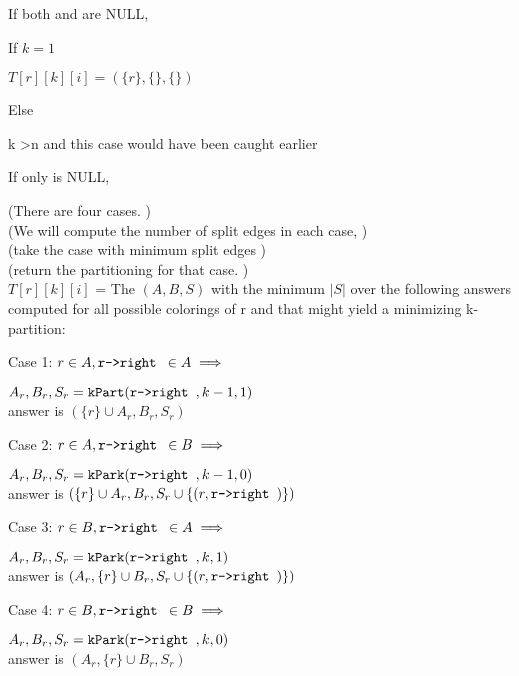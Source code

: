 \documentclass[11pt]{article}
\begin{document}
\begin{indentmore}
    If both \rleft and \rright are NULL,
        \begin{indentmore}
        If $k=1$
            \begin{indentmore}
            $T[r][k][i] = (\{r\}, \{\}, \{\})$
           \end{indentmore}
        Else
            \begin{indentmore}
            k \textgreater n and this case would have been caught earlier
           \end{indentmore}
       \end{indentmore}
    If only \rleft is NULL,
        \begin{indentmore}
        (There are four cases. )\\
        (We will compute the number of split edges in each case, )\\
        (take the case with minimum split edges )\\
        (return the partitioning for that case. )\\
        $T[r][k][i]$ = The $(A,B,S)$ with the minimum $|S|$ over the following answers computed for all possible colorings of r and \rright that might yield a minimizing k-partition:
          \begin{indentmore}
          Case 1: $r \in A, \texttt{r->right } \in A \implies $
            \begin{indentmore}
            $A_r, B_r, S_r = \mathtt{kPart}(\texttt{r->right },k-1,1)$\\
            answer is $(\{r\} \cup A_r, B_r, S_r)$
            \end{indentmore}
          Case 2: $r \in A, \texttt{r->right } \in B \implies $
            \begin{indentmore}
            $A_r, B_r, S_r = \mathtt{kPark}(\texttt{r->right },k-1,0)$\\
            answer is $(\{r\} \cup A_r, B_r, S_r \cup \{(r, \texttt{r->right })\})$
           \end{indentmore}
          Case 3: $r \in B, \texttt{r->right } \in A \implies $
            \begin{indentmore}
            $A_r, B_r, S_r = \mathtt{kPark}(\texttt{r->right },k,1)$\\
            answer is $(A_r,\{r\} \cup B_r, S_r \cup \{(r, \texttt{r->right })\})$
           \end{indentmore}
          Case 4: $r \in B, \texttt{r->right } \in B \implies $
            \begin{indentmore}
            $A_r, B_r, S_r = \mathtt{kPark}(\texttt{r->right },k,0)$\\
            answer is $(A_r,\{r\} \cup B_r, S_r)$
           \end{indentmore}
          \end{indentmore}


\end{indentmore}
\end{indentmore}
\end{document}
